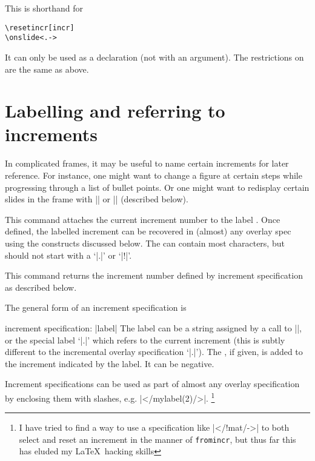 \documentclass[a4paper]{ltxdoc}
\begin{document}
\begin{command}{\fromincr{}}
  This is shorthand for
\begin{verbatim}
\resetincr[incr]
\onslide<.->
\end{verbatim}
It can only be used as a declaration (not with an argument).  The restrictions
on  are the same as above.  
\end{command}


\section{Labelling and referring to increments}\label{sec:labels}

In complicated frames, it may be useful to name certain increments for later
reference.  For instance, one might want to change a figure at certain steps
while progressing through a list of bullet points.  Or one might want to
redisplay certain slides in the frame with |\afterframe| or |\handoutframe|
(described below).

\begin{command}{\incrlabel {}}
  This command attaches the current increment number to the label .
  Once defined, the labelled increment can be recovered in (almost) any overlay
  spec using the constructs discussed below.  The  can contain most
  characters, but should not start with a `|.|'  or `|!|'.
\end{command}

\begin{command}{\incrref {}}
  This command returns the increment number defined by increment specification
   as described below.
\end{command}

\noindent
The general form of an increment specification is
\begin{command}{{increment specification}: |label|}
  The label can be a string assigned by a call to |\incrlabel|, or the special
  label `|.|' which refers to the current increment (this is subtly different to
  the incremental overlay specification `|.|').  The , if given, is
  added to the increment indicated by the label.  It can be negative.

  Increment specifications can be used as part of almost any overlay
  specification by enclosing them with slashes, e.g. |</mylabel(2)/>|.
  \footnote{I have tried to find a way
      to use a specification like |</!mat/->| to both select and reset an
      increment in the manner of \texttt{fromincr}, but thus far this has eluded my
      \LaTeX\ hacking skills}
\end{command}
\end{document}
